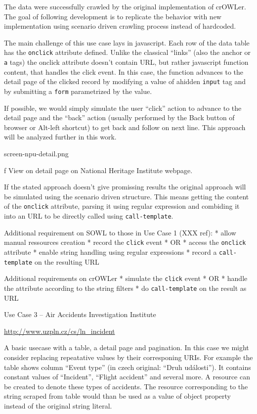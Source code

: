 The data were successfully crawled by the original implementation of crOWLer.
The goal of following development is to replicate the behavior with new
implementation using scenario driven crawling process instead of hardcoded. 

The main challenge of this use case lays in javascript. Each row of the data
table has the {\tt onclick} attribute defined. Unlike the classical ``links''
(also the anchor or {\tt a} tags) the onclick attribute doesn't contain URL,
but rather javascript function content, that handles the click event. In this
case, the function advances to the detail page of the clicked record by
modifying a value of ahidden {\tt input} tag and by submitting a {\tt form}
parametrized by the value. 

If possible, we would simply simulate the user ``click'' action to advance to
the detail page and the ``back'' action (usually performed by the Back button
of browser or Alt-left shortcut) to get back and follow on next line. This
approach will be analyzed further in this work.

\midinsert
\picw=12cm \cinspic screen-npu-detail.png
\caption/f View on detail page on National Heritage Institute webpage. 
\endinsert

If the stated approach doesn't give promissing results the original approach
will be simulated using the scenario driven structure. This means getting the
content of the {\tt onclick} attribute, parsing it using regular expression and
combiding it into an URL to be directly called using {\tt call-template}. 

Additional requirement on SOWL to those in Use Case 1 (XXX ref): 
\begitems
  * allow manual ressources creation
  * record the {\tt click} event 
  * OR
  * access the {\tt onclick} attribute
  * enable string handling using regular expressions
  * record a {\tt call-template} on the resulting URL 
\enditems

Additional requirements on crOWLer
\begitems
  * simulate the {\tt click} event
  * OR
  * handle the attribute according to the string filters
  * do {\tt call-template} on the result as URL
\enditems


\secc Use Case 3 -- Air Accidents Investigation Institute

\url{http://www.uzpln.cz/cs/ln_incident}

A basic usecase with a table, a detail page and pagination. In this case we
might consider replacing repeatative values by their corresponing URIs. For
example the table shows column ``Event type'' (in czech original: ``Druh
události''). It contains constant values of ``Incident'', ``Flight accident''
and several more. A resource can be created to denote these types of accidents.
The resource corresponding to the string scraped from table would than be used
as a value of object property instead of the original string literal. 

